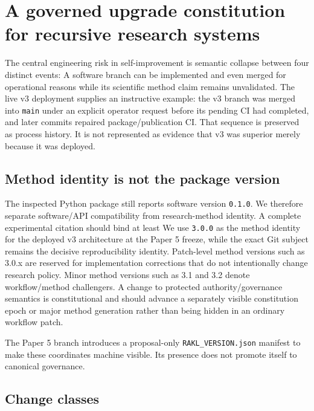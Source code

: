 \section{A governed upgrade constitution for recursive research systems}
\label{sec:upgrade}

The central engineering risk in self-improvement is semantic collapse between four distinct events:
A software branch can be implemented and even merged for operational reasons while its scientific method claim remains unvalidated. The live v3 deployment supplies an instructive example: the v3 branch was merged into \texttt{main} under an explicit operator request before its pending CI had completed, and later commits repaired package/publication CI. That sequence is preserved as process history. It is not represented as evidence that v3 was superior merely because it was deployed.

\subsection{Method identity is not the package version}

The inspected Python package still reports software version \texttt{0.1.0}. We therefore separate software/API compatibility from research-method identity. A complete experimental citation should bind at least
We use \texttt{3.0.0} as the method identity for the deployed v3 architecture at the Paper 5 freeze, while the exact Git subject remains the decisive reproducibility identity. Patch-level method versions such as 3.0.x are reserved for implementation corrections that do not intentionally change research policy. Minor method versions such as 3.1 and 3.2 denote workflow/method challengers. A change to protected authority/governance semantics is constitutional and should advance a separately visible constitution epoch or major method generation rather than being hidden in an ordinary workflow patch.

The Paper 5 branch introduces a proposal-only \texttt{RAKL\_VERSION.json} manifest to make these coordinates machine visible. Its presence does not promote itself to canonical governance.

\subsection{Change classes}

